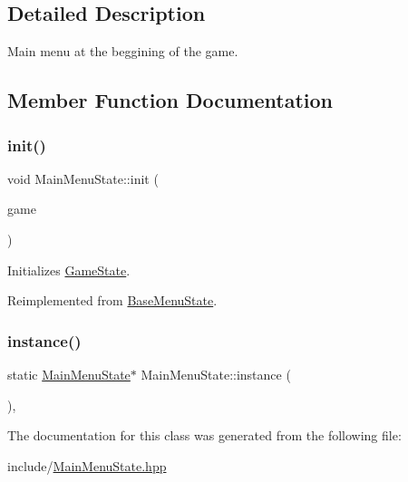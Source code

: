 \subsection{Detailed Description}
Main menu at the beggining of the game. 

\subsection{Member Function Documentation}
\mbox{\label{class_main_menu_state_a83efff7f63145d55d1937e76970d2a25}} 
\subsubsection{\texorpdfstring{init()}{init()}}
{\footnotesize\ttfamily void Main\+Menu\+State\+::init (\begin{DoxyParamCaption}\item[{\mbox{\hyperlink{class_game_engine}{Game\+Engine}} $\ast$}]{game }\end{DoxyParamCaption})\hspace{0.3cm}{\ttfamily [virtual]}}



Initializes \mbox{\hyperlink{class_game_state}{Game\+State}}. 



Reimplemented from \mbox{\hyperlink{class_base_menu_state_ae29d522c56a4582ce79e113426421741}{Base\+Menu\+State}}.

\mbox{\label{class_main_menu_state_aa74b0c80e78c1ef8f04da374a0907414}} 
\subsubsection{\texorpdfstring{instance()}{instance()}}
{\footnotesize\ttfamily static \mbox{\hyperlink{class_main_menu_state}{Main\+Menu\+State}}$\ast$ Main\+Menu\+State\+::instance (\begin{DoxyParamCaption}{ }\end{DoxyParamCaption})\hspace{0.3cm}{\ttfamily [inline]}, {\ttfamily [static]}}



The documentation for this class was generated from the following file\+:\begin{DoxyCompactItemize}
\item 
include/\mbox{\hyperlink{_main_menu_state_8hpp}{Main\+Menu\+State.\+hpp}}\end{DoxyCompactItemize}
